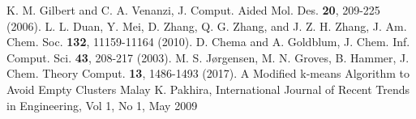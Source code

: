 \documentclass[aip,amsmath,amssymb,reprint]{revtex4-1}
\begin{document}
\begin{thebibliography}{12}
 K. M. Gilbert and C. A. Venanzi, J. Comput. Aided Mol. Des. \textbf{20}, 209-225 (2006).  
 L. L. Duan, Y. Mei, D. Zhang, Q. G. Zhang, and J. Z. H. Zhang, J. Am. Chem. Soc. \textbf{132}, 11159-11164 (2010).
 D. Chema and A. Goldblum, J. Chem. Inf. Comput. Sci. \textbf{43}, 208-217 (2003). 
 M. S. J{\o}rgensen, M. N. Groves, B. Hammer, J. Chem. Theory Comput. \textbf{13}, 1486-1493 (2017). 
 {A Modified k-means Algorithm to Avoid Empty Clusters} Malay K. Pakhira, International Journal of Recent Trends in Engineering, Vol 1, No 1, May 2009
\end{thebibliography}
\end{document}
